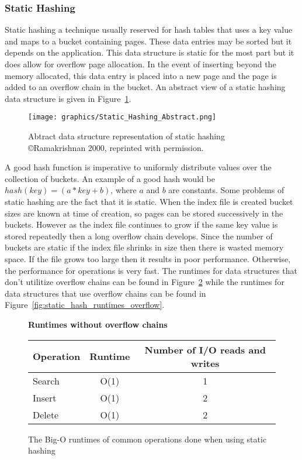 \documentclass[letterpaper, 11pt]{article}
\begin{document}
\subsubsection{Static Hashing}
Static hashing a technique usually reserved for hash tables that uses a key value and maps to a bucket containing pages. These
data entries may be sorted but it depends on the application. This data structure is static
for the most part but it does allow for overflow page allocation. In the event of inserting
beyond the memory allocated, this data entry is placed into a new page and the page is added
to an overflow chain in the bucket. An abstract view of a static hashing data structure is given in 
Figure~\ref{fig:static_abstract}.
\par\vspace{\baselineskip}

\begin{figure}[H]
  \centering
  \texttt{[image: graphics/Static\_Hashing\_Abstract.png]}
  \caption{Abtract data structure representation of static hashing \newline \copyright Ramakrishnan 2000, 
  reprinted with permission.\cite{ramakrishnan2000database}}
  \label{fig:static_abstract}
\end{figure}

A good hash function is imperative to uniformly distribute values over the collection of buckets.
An example of a good hash would be $hash(key) = (a*key + b)$, where $a$ and $b$ are constants. Some problems
of static hashing are the fact that it is static. When the index file is created bucket sizes
are known at time of creation, so pages can be stored successively in the buckets. However
as the index file continues to grow if the same key value is stored repeatedly then a long
overflow chain develops. Since the number of buckets are static if the index file shrinks
in size then there is wasted memory space. If the file grows too large then it results in
poor performance. Otherwise, the performance for operations is very fast. The runtimes
for data structures that don't utilitize overflow chains can be found in Figure~\ref{fig:static_hash_runtimes}
while the runtimes for data structures that use overflow chains can be found in
Figure~\ref{fig:static_hash_runtimes_overflow}.
\par\vspace{\baselineskip}

\begin{figure}[H]
\centering
\textbf{Runtimes without overflow chains}
\begin{tabular}{l | c | c}
  \hline
  Operation & Runtime & Number of I/O reads and writes \\ \hline \hline
  Search & O(1) & 1  \\ \hline
  Insert & O(1) & 2  \\ \hline
  Delete & O(1) & 2  \\ \hline
\end{tabular}
\caption{The Big-O runtimes of common operations done when using static hashing}
\label{fig:static_hash_runtimes}
\end{figure}
\end{document}
